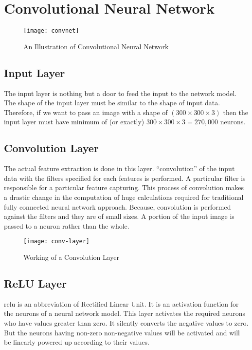     \section{Convolutional Neural Network}
        
        \begin{figure}[h]
            \centering
            \texttt{[image: convnet]}
            \caption{An Illustration of Convolutional Neural Network}
            \label{fig:convnet}
        \end{figure}   
    
        \subsection{Input Layer}
            The input layer is nothing but a door to feed the input to the network model. The shape of the input layer must be similar to the shape of input data. Therefore, if we want to pass an image with a shape of $(300\times 300\times 3)$ then the input layer must have minimum of (or exactly) $300\times 300\times 3 = 270,000$ neurons.
        
        \subsection{Convolution Layer}
            The actual feature extraction is done in this layer. ``convolution'' of the input data with the filters specified for each features is performed. A particular filter is responsible for a particular feature capturing. This process of convolution makes a drastic change in the computation of huge calculations required for traditional fully connected neural network approach. Because, convolution is performed against the filters and they are of small sizes. A portion of the input image is passed to a neuron rather than the whole. 
            \begin{figure}[h]
                \centering
                \texttt{[image: conv-layer]}
                \caption{Working of a Convolution Layer}
                \label{fig:conv_layer}
            \end{figure}
    
        \subsection{ReLU Layer}
            \gls{relu} is an abbreviation of Rectified Linear Unit. It is an activation function for the neurons of a neural network model. This layer activates the required neurons who have values greater than zero. It silently converts the negative values to zero. But the neurons having non-zero non-negative values will be activated and will be linearly powered up according to their values.
    
